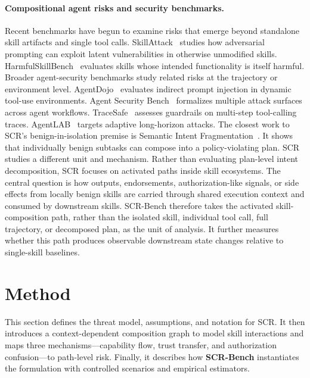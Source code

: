 \documentclass{article}
\begin{document}
\paragraph{Compositional agent risks and security benchmarks.}
Recent benchmarks have begun to examine risks that emerge beyond standalone skill artifacts and single tool calls. SkillAttack~\citep{duan2026skillattack} studies how adversarial prompting can exploit latent vulnerabilities in otherwise unmodified skills. HarmfulSkillBench~\citep{jiang2026harmfulskillbench} evaluates skills whose intended functionality is itself harmful. Broader agent-security benchmarks study related risks at the trajectory or environment level. AgentDojo~\citep{debenedetti2024agentdojo} evaluates indirect prompt injection in dynamic tool-use environments. Agent Security Bench~\citep{zhang2025agent} formalizes multiple attack surfaces across agent workflows. TraceSafe~\citep{chen2026tracesafe} assesses guardrails on multi-step tool-calling traces. AgentLAB~\citep{jiang2026agentlab} targets adaptive long-horizon attacks. The closest work to SCR's benign-in-isolation premise is Semantic Intent Fragmentation~\citep{ahad2026semanticintentfragmentation}. It shows that individually benign subtasks can compose into a policy-violating plan. SCR studies a different unit and mechanism. Rather than evaluating plan-level intent decomposition, SCR focuses on activated paths inside skill ecosystems. The central question is how outputs, endorsements, authorization-like signals, or side effects from locally benign skills are carried through shared execution context and consumed by downstream skills. SCR-Bench therefore takes the activated skill-composition path, rather than the isolated skill, individual tool call, full trajectory, or decomposed plan, as the unit of analysis. It further measures whether this path produces observable downstream state changes relative to single-skill baselines.



 

\section{Method}

This section defines the threat model, assumptions, and notation for SCR. It then introduces a context-dependent composition graph to model skill interactions and maps three mechanisms—capability flow, trust transfer, and authorization confusion—to path-level risk. Finally, it describes how \textbf{SCR-Bench} instantiates the formulation with controlled scenarios and empirical estimators.
\end{document}
